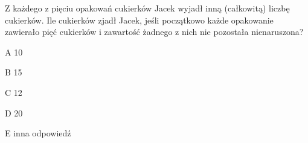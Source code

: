\begin{tresc}
Z każdego z pięciu opakowań cukierków Jacek wyjadł inną (całkowitą) liczbę cukierków. Ile cukierków zjadł Jacek, jeśli początkowo każde opakowanie zawierało pięć cukierków i zawartość żadnego z nich nie pozostała nienaruszona?
\end{tresc}
\begin{wariant}{A} 10 \end{wariant}
\begin{wariant}{B} 15 \end{wariant}
\begin{wariant}{C} 12 \end{wariant}
\begin{wariant}{D} 20 \end{wariant}
\begin{wariant}{E} inna odpowiedź \end{wariant}

